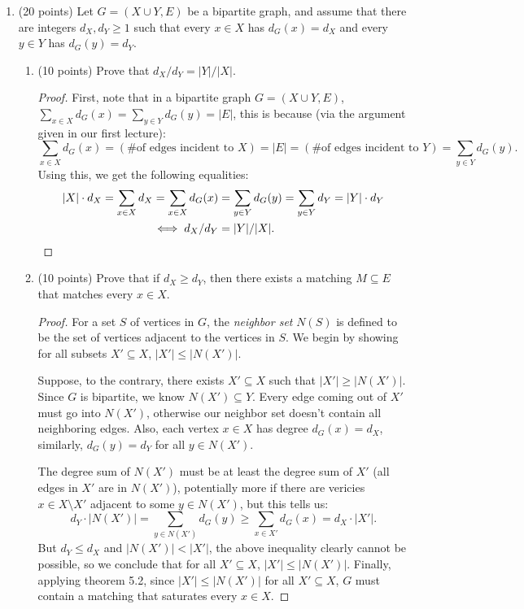 \documentclass[11pt]{article}
\newcommand{\n}{\vspace{0.3cm}}
\begin{document}
\begin{enumerate}
\begin{enumerate}[label=(\alph*)]
      \end{enumerate} \n

    \item (20 points) Let \(G = (X \cup Y, E)\) be a bipartite graph, and assume that there are integers \(d_X, d_Y \geq 1\) such that every \(x \in X\) has \(d_G(x) = d_X\) and every \(y \in Y\) has \(d_G(y) = d_Y\).
      \begin{enumerate}
        \item (10 points) Prove that \(d_X / d_Y = |Y|/|X|\).
          \begin{proof}
            First, note that in a bipartite graph \(G = (X \cup Y, E)\), \(\sum_{x \in X} d_G(x) = \sum_{y \in Y} d_G(y) = |E|\), this is because (via the argument given in our first lecture):
            \[\sum_{x \in X} d_G(x) = (\text{\# of edges incident to } X) = |E| = (\text{\# of edges incident to } Y) = \sum_{y \in Y} d_G(y).\]
            Using this, we get the following equalities:
            \begin{align*}
              |X| \cdot d_X = \sum_{x \in X} d_X = \sum_{x \in X} d_G(x)  &= \sum_{y \in Y} d_G(y) = \sum_{y \in Y} d_Y = |Y| \cdot d_Y \\
              \iff d_X / d_Y &= |Y| / |X|. \qedhere
            \end{align*}
          \end{proof}
          

        \item (10 points) Prove that if \(d_X \geq d_Y\), then there exists a matching \(M \subseteq E\) that matches every \(x \in X\).
          \begin{proof}
            For a set \(S\) of vertices in \(G\), the \textit{neighbor set} \(N(S)\) is defined to be the set of vertices adjacent to the vertices in \(S\).  We begin by showing for all subsets \(X' \subseteq X\), \(|X'| \leq |N(X')|\). \n

            Suppose, to the contrary, there exists \(X' \subseteq X\) such that \(|X'| \geq |N(X')|\).  Since \(G\) is bipartite, we know \(N(X') \subseteq Y\).  Every edge coming out of \(X'\) must go into \(N(X')\), otherwise our neighbor set doesn't contain all neighboring edges.  Also, each vertex \(x \in X\) has degree \(d_G(x) = d_X\), similarly, \(d_G(y) = d_Y\) for all \(y \in N(X')\). \n

            The degree sum of \(N(X')\) must be at least the degree sum of \(X'\) (all edges in \(X'\) are in \(N(X')\)), potentially more if there are vericies \(x \in X \setminus X'\) adjacent to some \(y \in N(X')\), but this tells us:
            \[d_Y \cdot |N(X')| = \sum_{y \in N(X')} d_G(y) \geq \sum_{x \in X'} d_G(x) = d_X \cdot |X'|.\]
            But \(d_Y \leq d_X\) and \(|N(X')| < |X'|\), the above inequality clearly cannot be possible, so we conclude that for all \(X' \subseteq X\), \(|X'| \leq |N(X')|\).  Finally, applying theorem 5.2, since  \(|X'| \leq |N(X')|\) for all  \(X' \subseteq X\), \(G\) must contain a matching that saturates every \(x \in X\).
          \end{proof} \n
          


\end{enumerate}
\end{enumerate}
\end{document}
